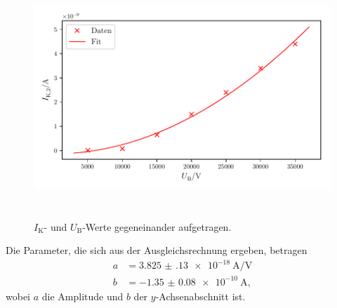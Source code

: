 \begin{figure}
    \centering
    \includegraphics[width=15cm, height=9cm]{build/plot4.pdf}
    \caption{$I_\text{K}$- und $U_\text{B}$-Werte gegeneinander aufgetragen.}
    \label{fig:plot4}
\end{figure}

\noindent Die Parameter, die sich aus der Ausgleichsrechnung ergeben, betragen
\begin{align*}
    a &= \SI{3.825(130)e-18}{\ampere\per\volt}\\
    b &= \SI{-1.35(8)e-10}{\ampere},
\end{align*}
wobei $a$ die Amplitude und $b$ der $y$-Achsenabschnitt ist.